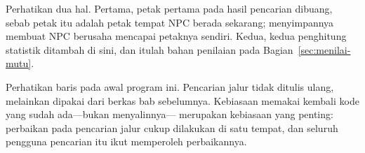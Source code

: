 Perhatikan dua hal. Pertama, petak pertama pada hasil pencarian dibuang, sebab
petak itu adalah petak tempat NPC berada sekarang; menyimpannya membuat NPC
berusaha mencapai petaknya sendiri. Kedua, kedua penghitung statistik ditambah
di sini, dan itulah bahan penilaian pada Bagian~\ref{sec:menilai-mutu}.

\begin{catatabox}
Perhatikan baris  pada awal program ini.
Pencarian jalur tidak ditulis ulang, melainkan dipakai dari berkas bab
sebelumnya. Kebiasaan memakai kembali kode yang sudah ada---bukan menyalinnya---
merupakan kebiasaan yang penting: perbaikan pada pencarian jalur cukup
dilakukan di satu tempat, dan seluruh pengguna pencarian itu ikut memperoleh
perbaikannya.
\end{catatabox}

